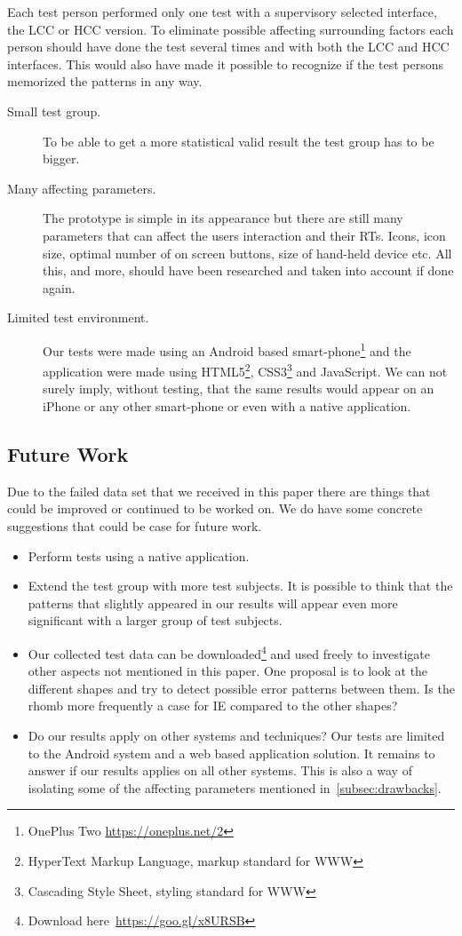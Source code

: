 \documentclass[runningheads,a4paper]{llncs}
\begin{document}
Each test person performed only one test with a supervisory selected interface, the LCC or HCC version. To eliminate possible affecting surrounding factors each person should have done the test several times and with both the LCC and HCC interfaces. This would also have made it possible to recognize if the test persons memorized the patterns in any way.

\begin{description}
	\item[Small test group.] To be able to get a more statistical valid result the test group has to be bigger.
	\item[Many affecting parameters.] The prototype is simple in its appearance but there are still many parameters that can affect the users interaction and their RTs. Icons, icon size, optimal number of on screen buttons, size of hand-held device etc. All this, and more, should have been researched and taken into account if done again. 
	\item[Limited test environment.] Our tests were made using an Android based smart-phone\footnote{OnePlus Two \url{https://oneplus.net/2}} and the application were made using HTML5\footnote{HyperText Markup Language, markup standard for WWW}, CSS3\footnote{Cascading Style Sheet, styling standard for WWW} and JavaScript. We can not surely imply, without testing, that the same results would appear on an iPhone or any other smart-phone or even with a native application.
\end{description}

\subsection{Future Work}
Due to the failed data set that we received in this paper there are things that could be improved or continued to be worked on. 
We do have some concrete suggestions that could be case for future work. 

\begin{itemize}
	\item Perform tests using a native application.
	\item Extend the test group with more test subjects. It is possible to think that the patterns that slightly appeared in our results will appear even more significant with a larger group of test subjects.
	\item Our collected test data can be downloaded\footnote{Download here~\url{https://goo.gl/x8URSB}} and used freely to investigate other aspects not mentioned in this paper. One proposal is to look at the different shapes and try to detect possible error patterns between them. Is the rhomb more frequently a case for IE compared to the other shapes?
	\item Do our results apply on other systems and techniques? Our tests are limited to the Android system and a web based application solution. It remains to answer if our results applies on all other systems. This is also a way of isolating some of the affecting parameters mentioned in~\ref{subsec:drawbacks}.
\end{itemize}
\end{document}

